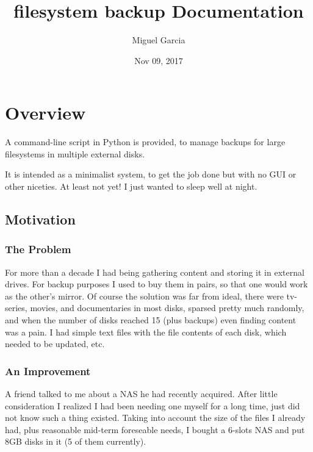 \documentclass[letterpaper,10pt,english]{sphinxmanual}
\title{filesystem backup Documentation}
\date{Nov 09, 2017}
\author{Miguel Garcia}
\begin{document}
\maketitle
\sphinxtableofcontents
{}\label{\detokenize{index::doc}}



\chapter{Overview}
\label{\detokenize{index:module-fsbackup-multi-volume-backup-for-large-filesystems}}\label{\detokenize{index:overview}}
A command-line script in Python is provided, to manage backups for large filesystems in multiple external disks.

It is intended as a minimalist system, to get the job done but with no GUI or other niceties. At least not yet!
I just wanted to sleep well at night.


\section{Motivation}
\label{\detokenize{index:motivation}}

\subsection{The Problem}
\label{\detokenize{index:the-problem}}
For more than a decade I had being gathering content and
storing it in external drives.
For backup purposes I used to buy them in pairs, so that one would work as the other's mirror.
Of course the solution was far from ideal, there were tv-series, movies, and documentaries in most disks,
sparsed pretty much randomly, and when the number of disks reached 15 (plus backups) even finding content was a pain.
I had simple text files with the file contents of each disk, which needed to be updated, etc.


\subsection{An Improvement}
\label{\detokenize{index:an-improvement}}
A friend talked to me about a NAS he had recently acquired. After little consideration I realized I had been needing
one myself for a long time, just did not know such a thing existed. Taking into account the size of the files I already had,
plus reasonable mid-term foreseable needs, I bought a 6-slots NAS and put 8GB disks in it (5 of them currently).
\end{document}
